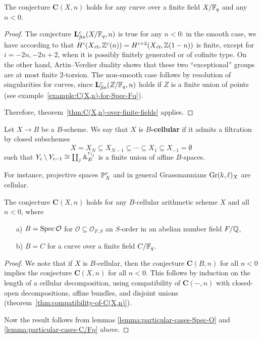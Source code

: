 \documentclass{article}
\numberwithin{equation}{section}
\begin{document}
\begin{lemma}
  \label{lemma:particular-cases-C/Fq}
  The conjecture $\mathbf{C} (X,n)$ holds for any curve over a finite field
  $X/\FF_q$ and any $n < 0$.

  \begin{proof}
    The conjecture $\mathbf{L}^c_\fin (X/\FF_q,n)$ is true for any $n < 0$: in
    the smooth case, we have according to \cite[Proposition~4.3]{Geisser-2017}
    that $H^i (X_\et, \ZZ^c (n)) = H^{i+2} (X_\et, \ZZ (1-n))$ is finite, except
    for $i = -2n, -2n + 2$, when it is possibly finitely generated or of
    cofinite type. On the other hand, Artin--Verdier duality
    \cite[Theorem~I]{Beshenov-Weil-etale-1} shows that these two ``exceptional''
    groups are at most finite $2$-torsion. The non-smooth case follows by
    resolution of singularities for curves, since
    $\mathbf{L}^c_\fin (Z/\FF_q,n)$ holds if $Z$ is a finite union of points
    (see example~\ref{example:C(X,n)-for-Spec-Fq}).

    Therefore, theorem~\ref{thm:C(X,n)-over-finite-fields} applies.
  \end{proof}
\end{lemma}

\begin{definition}
  \label{dfn:B-cellular-scheme}
  Let $X \to B$ be a $B$-scheme. We say that $X$ is \textbf{$B$-cellular} if it
  admits a filtration by closed subschemes
  $$X = X_N \subseteq X_{N-1} \subseteq \cdots \subseteq X_1 \subseteq X_{-1} = \emptyset$$
  such that $Y_i\setminus Y_{i-1} \cong \coprod_j \AA^{r_{i_j}}_B$ is a finite
  union of affine $B$-spaces.
\end{definition}

For instance, projective spaces $\PP^r_X$ and in general Grassmannians
$\Gr (k,\ell)_X$ are cellular.

\begin{theorem}
  The conjecture $\mathbf{C} (X,n)$ holds for any $B$-cellular arithmetic scheme
  $X$ and all $n < 0$, where
  \begin{enumerate}
  \item[a)] $B = \Spec \mathcal{O}$ for
    $\mathcal{O} \subseteq \mathcal{O}_{F,S}$ an $S$-order in an abelian number
    field $F/\QQ$,

  \item[b)] $B = C$ for a curve over a finite field $C/\FF_q$.
  \end{enumerate}

  \begin{proof}
    We note that if $X$ is $B$-cellular, then the conjecture $\mathbf{C} (B,n)$
    for all $n < 0$ implies the conjecture $\mathbf{C} (X,n)$ for all $n < 0$.
    This follows by induction on the length of a cellular decomposition, using
    compatibility of $\mathbf{C} (-,n)$ with closed-open decompositions, affine
    bundles, and disjoint unions (theorem~\ref{thm:compatibility-of-C(X,n)}).

    Now the result follows from lemmas \ref{lemma:particular-cases-Spec-O} and
    \ref{lemma:particular-cases-C/Fq} above.
  \end{proof}
\end{theorem}
\end{document}
